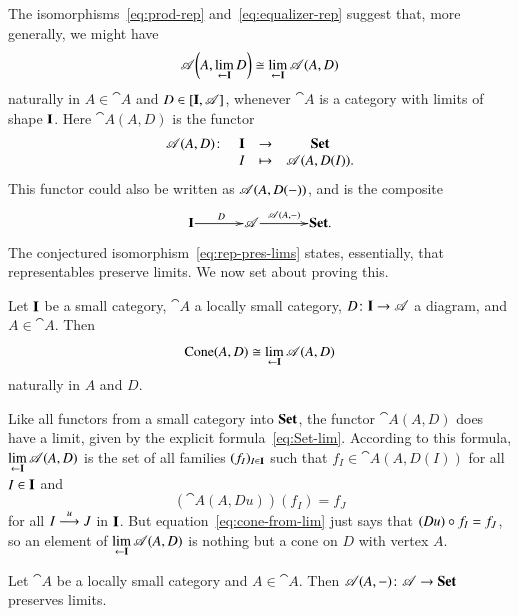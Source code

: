 The isomorphisms~\eqref{eq:prod-rep} and~\eqref{eq:equalizer-rep} suggest
that, more generally, we might have
%
\begin{equation}
\label{eq:rep-pres-lims}
\mathscr{A}\biggl(A, \lim\limits_{\leftarrow \mathbf{I}} D\biggr)
\cong
\lim\limits_{\leftarrow \mathbf{I}} \mathscr{A}(A, D)
\end{equation}
%
naturally in $A \in \cat{A}$ and $D \in [\mathbf{I},\mathscr{A}]$, whenever
$\cat{A}$ is a category with limits of shape $\mathbf{I}$.  Here $\cat{A}(A,
D)$%
%
%
is the functor
\[
\begin{array}{cccc}
\cat{A}(A, D)\from      &\scat{I}       &\to        &\Set   \\
                        &I              &\mapsto    &\cat{A}(A, D(I)).
\end{array}
\]
This functor could also be written as $\mathscr{A}(A, D(-))$, and is the
composite
\[
\xymatrix@1@C+1em{
\scat{I} \ar[r]^D       &
\cat{A} \ar[r]^-{\cat{A}(A, \dashbk)}    &
\Set.
}
\]
The conjectured isomorphism~\eqref{eq:rep-pres-lims} states, essentially,
that representables preserve limits.  We now set about proving this.

\begin{lemma}
\label{lemma:cone-rep}
Let $\mathbf{I}$ be a small category, $\cat{A}$ a locally small category, $D\from
\scat{I} \to \cat{A}$ a diagram, and $A \in \cat{A}$.  Then
\[
\Cone(A, D)
\iso
\lt{\scat{I}} \cat{A}(A, D)
%
\index{cone!set of cones as limit}
%
\]
naturally in $A$ and $D$.
\end{lemma}

\begin{pf}
Like all functors from a small category into $\mathbf{Set}$, the functor
$\cat{A}(A, D)$ does have a limit, given by the explicit
formula~\eqref{eq:Set-lim}.  According to this formula, $\lim\limits_{\leftarrow \mathbf{I}}
\mathscr{A}(A, D)$ is the set of all families $(f_I)_{I \in \mathbf{I}}$ such
that $f_I \in \cat{A}(A, D(I))$ for all $I \in \mathbf{I}$ and
%
\begin{equation}
\label{eq:cone-from-lim}
(\cat{A}(A, Du))(f_I)
=
f_J
\end{equation}
%
for all $I \stackrel{u}{\longrightarrow} J$ in $\mathbf{I}$.  But equation~\eqref{eq:cone-from-lim}
just says that $(Du) \mathbin{\circ} f_I = f_J$, so an element of
$\lim\limits_{\leftarrow \mathbf{I}} \mathscr{A}(A, D)$ is nothing but a cone on $D$ with vertex $A$.
\end{pf}

\begin{propn}
\label{propn:reps-cts}
\hspace*{-5pt}%
Let $\cat{A}$ be a locally small category and $A \in \cat{A}$.  Then
$\cat{A}(A, \dashbk) \from \cat{A} \to \Set$ preserves limits.
\end{propn}

